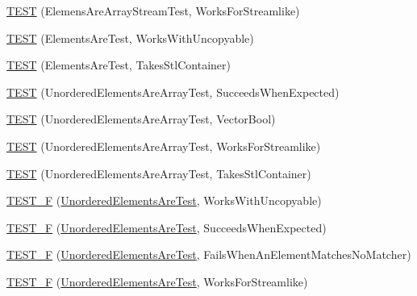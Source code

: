\begin{DoxyCompactItemize}
\hyperlink{namespacetesting_1_1gmock__matchers__test_a5cc317a80c3501cb7f53d07043b7270c}{T\+E\+ST} (Elemens\+Are\+Array\+Stream\+Test, Works\+For\+Streamlike)
\item 
\hyperlink{namespacetesting_1_1gmock__matchers__test_ab403dce87c2d198a4f709d7f781d03c6}{T\+E\+ST} (Elements\+Are\+Test, Works\+With\+Uncopyable)
\item 
\hyperlink{namespacetesting_1_1gmock__matchers__test_a290280b9e89a57833c9fc706d153b98a}{T\+E\+ST} (Elements\+Are\+Test, Takes\+Stl\+Container)
\item 
\hyperlink{namespacetesting_1_1gmock__matchers__test_adb7e47654f1536fc049243f765292825}{T\+E\+ST} (Unordered\+Elements\+Are\+Array\+Test, Succeeds\+When\+Expected)
\item 
\hyperlink{namespacetesting_1_1gmock__matchers__test_a3d7df4fa0dd3e8247f4c2d4b02d801f0}{T\+E\+ST} (Unordered\+Elements\+Are\+Array\+Test, Vector\+Bool)
\item 
\hyperlink{namespacetesting_1_1gmock__matchers__test_a1ff2a93a8f031a5b23dbc699a462043b}{T\+E\+ST} (Unordered\+Elements\+Are\+Array\+Test, Works\+For\+Streamlike)
\item 
\hyperlink{namespacetesting_1_1gmock__matchers__test_aa3a960ec78e2b1e860c305f4598f39ec}{T\+E\+ST} (Unordered\+Elements\+Are\+Array\+Test, Takes\+Stl\+Container)
\item 
\hyperlink{namespacetesting_1_1gmock__matchers__test_ab09132c3b991b8f104f3091370d2fe55}{T\+E\+S\+T\+\_\+F} (\hyperlink{classtesting_1_1gmock__matchers__test_1_1UnorderedElementsAreTest}{Unordered\+Elements\+Are\+Test}, Works\+With\+Uncopyable)
\item 
\hyperlink{namespacetesting_1_1gmock__matchers__test_a177c3db59da001df2441deb1ddb083af}{T\+E\+S\+T\+\_\+F} (\hyperlink{classtesting_1_1gmock__matchers__test_1_1UnorderedElementsAreTest}{Unordered\+Elements\+Are\+Test}, Succeeds\+When\+Expected)
\item 
\hyperlink{namespacetesting_1_1gmock__matchers__test_a62fd481b1160a667c785e6009ff87163}{T\+E\+S\+T\+\_\+F} (\hyperlink{classtesting_1_1gmock__matchers__test_1_1UnorderedElementsAreTest}{Unordered\+Elements\+Are\+Test}, Fails\+When\+An\+Element\+Matches\+No\+Matcher)
\item 
\hyperlink{namespacetesting_1_1gmock__matchers__test_a2affca2a152e4537c2f06518eaa2eac5}{T\+E\+S\+T\+\_\+F} (\hyperlink{classtesting_1_1gmock__matchers__test_1_1UnorderedElementsAreTest}{Unordered\+Elements\+Are\+Test}, Works\+For\+Streamlike)
\item 

\end{DoxyCompactItemize}
